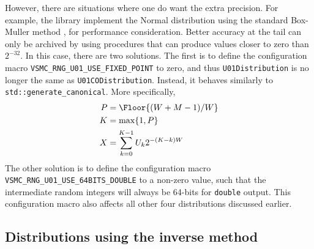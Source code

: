 However, there are situations where one do want the extra precision. For
example, the library implement the Normal distribution using the standard
Box-Muller method \parencite{Box:1958hv}, for performance consideration. Better
accuracy at the tail can only be archived by using procedures that can produce
values closer to zero than $2^{-32}$. In this case, there are two solutions.
The first is to define the configuration macro
\verb|VSMC_RNG_U01_USE_FIXED_POINT| to zero, and thus \verb|U01Distribution| is
no longer the same as \verb|U01CODistribution|. Instead, it behaves similarly
to \verb|std::generate_canonical|. More specifically,
\begin{align*}
  P &= \Floor{(W + M - 1) / W} \\
  K &= \max\{1, P\} \\
  X &= \sum_{k=0}^{K - 1} U_k 2^{-(K - k)W}
\end{align*}
The other solution is to define the configuration macro
\verb|VSMC_RNG_U01_USE_64BITS_DOUBLE| to a non-zero value, such that the
intermediate random integers will always be 64-bits for \verb|double| output.
This configuration macro also affects all other four distributions discussed
earlier.

\subsection{Distributions using the inverse method}
\label{sub:Distributions using the inverse method}

